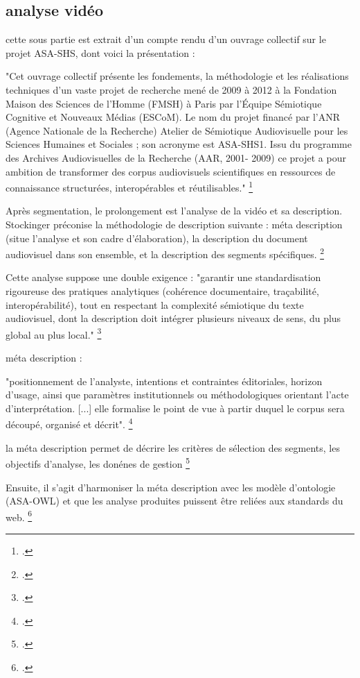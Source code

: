 \subsection{analyse vidéo}

cette sous partie est extrait d'un compte rendu d'un ouvrage collectif sur le projet ASA-SHS, dont voici la présentation :

"Cet ouvrage collectif présente les fondements, la méthodologie et les réalisations techniques d’un vaste projet de recherche mené de 2009 à 2012 à la Fondation Maison des Sciences de l’Homme (FMSH) à Paris par l’Équipe Sémiotique Cognitive et Nouveaux Médias (ESCoM).
Le nom du projet financé par l’ANR (Agence Nationale de la Recherche) Atelier de Sémiotique Audiovisuelle pour les Sciences Humaines et Sociales ; son acronyme est ASA-SHS1. Issu du programme des Archives Audiovisuelles de la Recherche (AAR,
2001- 2009) ce projet a pour ambition de transformer des corpus
audiovisuels scientifiques en ressources de connaissance structurées, interopérables et réutilisables." \footcite{stockinger2011}

Après segmentation, le prolongement est l'analyse de la vidéo et sa description. Stockinger préconise la méthodologie de description suivante : méta description (situe l'analyse et son cadre d'élaboration), la description du document audiovisuel dans son ensemble, et la description des segments spécifiques. \footcite{stockinger2011}

Cette analyse suppose une double exigence : "garantir une standardisation rigoureuse des pratiques analytiques (cohérence documentaire, traçabilité, interopérabilité), tout en respectant la complexité sémiotique du texte audiovisuel, dont la description
doit intégrer plusieurs niveaux de sens, du plus global au plus local." \footcite{stockinger2011}

méta description : 

"positionnement de l’analyste, intentions et contraintes éditoriales, horizon d’usage, ainsi que paramètres institutionnels ou méthodologiques orientant l’acte d’interprétation. [...] elle formalise le point de vue à partir duquel le corpus sera découpé, organisé et décrit". \footcite{stockinger2011}

la méta description permet de décrire les critères de sélection des segments, les objectifs d'analyse, les donénes de gestion \footcite{stockinger2011}

Ensuite, il s'agit d'harmoniser la méta description avec les modèle d'ontologie (ASA-OWL) et que les analyse produites puissent être reliées aux standards du web. \footcite{stockinger2011}

